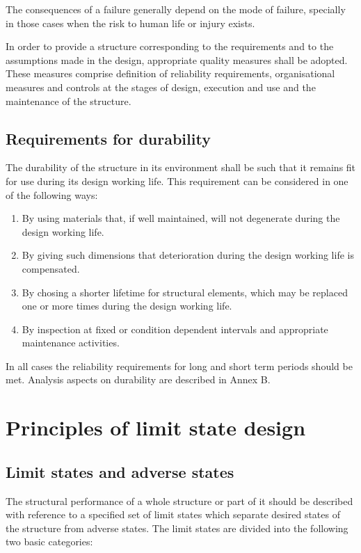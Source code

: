 \documentclass[%
oneside,                 %
final,                   %
10pt]{article}
\begin{document}
The consequences of a failure generally depend on the mode of failure, specially in those cases when the risk to human life or injury exists.

In order to provide a structure corresponding to the requirements and to the assumptions made in the design, appropriate quality measures shall be adopted. These measures comprise definition of reliability requirements, organisational measures and controls at the stages of design, execution and use and the maintenance of the structure.

\subsection{Requirements for durability}
The durability of the structure in its environment shall be such that it remains fit for use during its design working life. This requirement can be considered in one of the following ways:

\begin{enumerate}
\item By using materials that, if well maintained, will not degenerate during the design working life.

\item By giving such dimensions that deterioration during the design working life is compensated.

\item By chosing a shorter lifetime for structural elements, which may be replaced one or more times during the design working life.

\item By inspection at fixed or condition dependent intervals and appropriate maintenance activities.
\end{enumerate}

\noindent
In all cases the reliability requirements for long and short term periods should be met. Analysis aspects on durability are described in Annex B.

\section{Principles of limit state design}

\subsection{Limit states and adverse states}

The structural performance of a whole structure or part of it should be described with reference to a specified set of limit states which separate desired states of the structure from adverse states.
The limit states are divided into the following two basic categories:
\end{document}
